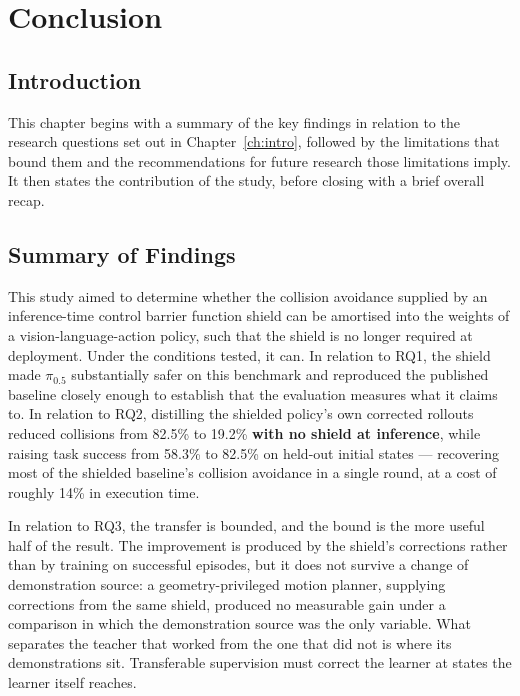 \documentclass[a4paper,11pt]{report}
\begin{document}
\chapter{Conclusion}\label{ch:conclusion}

\section{Introduction}\label{sec:conc:intro}

This chapter begins with a summary of the key findings in relation to the research questions set
out in Chapter~\ref{ch:intro}, followed by the limitations that bound them and the recommendations
for future research those limitations imply. It then states the contribution of the study, before
closing with a brief overall recap.

\section{Summary of Findings}\label{sec:conc:summary}

This study aimed to determine whether the collision avoidance supplied by an inference-time control
barrier function shield can be amortised into the weights of a vision-language-action policy, such
that the shield is no longer required at deployment. Under the conditions tested, it can. In
relation to RQ1, the shield made $\pi_{0.5}$ substantially safer on this benchmark and reproduced
the published baseline closely enough to establish that the evaluation measures what it claims to.
In relation to RQ2, distilling the shielded policy's own corrected rollouts reduced collisions from
82.5\% to 19.2\% \textbf{with no shield at inference}, while raising task success from 58.3\% to
82.5\% on held-out initial states --- recovering most of the shielded baseline's collision
avoidance in a single round, at a cost of roughly 14\% in execution time.

In relation to RQ3, the transfer is bounded, and the bound is the more useful half of the result.
The improvement is produced by the shield's corrections rather than by training on successful
episodes, but it does not survive a change of demonstration source: a geometry-privileged motion
planner, supplying corrections from the same shield, produced no measurable gain under a comparison
in which the demonstration source was the only variable. What separates the teacher that worked
from the one that did not is where its demonstrations sit. Transferable supervision must correct
the learner at states the learner itself reaches.
\end{document}
